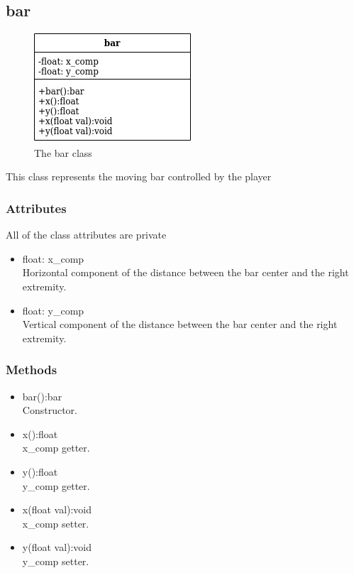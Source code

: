 \documentclass[]{article}
\begin{document}
\subsection{bar}
\begin{figure}[h!]
    \centering
    \includegraphics[scale=0.5]{bar.jpg}
    \caption{The bar class}
    \label{fig:bar class diagram }
\end{figure}
This class represents the moving bar controlled by the player
\subsubsection{Attributes}
All of the class attributes are private
	\begin{itemize}
		\item float: x\_comp\\Horizontal component of the distance between the bar center and the right extremity.
		\item float: y\_comp\\Vertical component of the distance between the bar center and the right extremity.
	\end{itemize}
\subsubsection{Methods}
	\begin{itemize}
		\item bar():bar\\Constructor.
		\item x():float\\x\_comp getter.
		\item y():float\\y\_comp getter.
		\item x(float val):void\\x\_comp setter.
		\item y(float val):void\\y\_comp setter.
	\end{itemize}
\newpage
\end{document}
